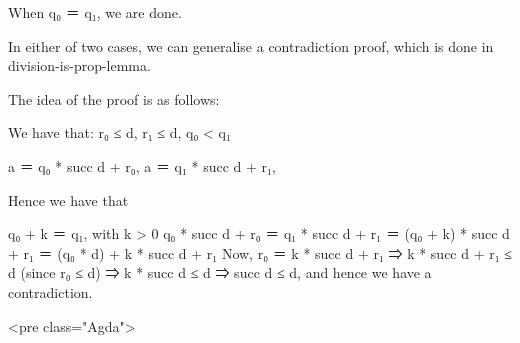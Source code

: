 When q₀ ＝ q₁, we are done.

In either of two cases, we can generalise a contradiction proof, which
is done in division-is-prop-lemma.

The idea of the proof is as follows:

We have that:
r₀ ≤ d,
r₁ ≤ d,
q₀ < q₁

a ＝ q₀ * succ d + r₀,
a ＝ q₁ * succ d + r₁,

Hence we have that

q₀ + k ＝ q₁, with k > 0
q₀ * succ d + r₀ ＝ q₁ * succ d + r₁
                 ＝ (q₀ + k) * succ d + r₁
                 ＝ (q₀ * d) + k * succ d + r₁
Now, r₀ ＝ k * succ d + r₁
   ⇒ k * succ d + r₁ ≤ d    (since r₀ ≤ d)
   ⇒ k * succ d ≤ d
   ⇒ succ d ≤ d, and hence we have a contradiction.

<pre class="Agda">

